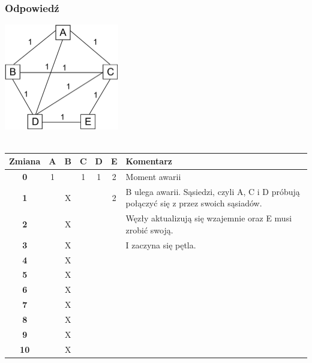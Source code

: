 		\subsubsection{Odpowiedź}
			\includegraphics[width=5.0cm]{./images/zadanie04.pdf}\\\\
			\begin{tabular}{|c|c|c|c|c|c|p{7cm}|}
				\hline \textbf{Zmiana} & \textbf{A} & \textbf{B} & \textbf{C} & \textbf{D} & \textbf{E} & \textbf{Komentarz} \\ 
				\hline \textbf{0} & 1 & \color{red}{X} & 1 & 1 & 2 & Moment awarii \\ 
				\hline \textbf{1} & \color{red}{2} & X & \color{red}{2} & \color{red}{2} & 2 & B ulega awarii. Sąsiedzi, czyli A, C i D próbują połączyć się z przez swoich sąsiadów. \\ 
				\hline \textbf{2} & \color{red}{3} & X & \color{red}{3} & \color{red}{3} & \color{red}{3} & Węzły aktualizują się wzajemnie oraz E musi zrobić swoją. \\ 
				\hline \textbf{3} & \color{red}{4} & X & \color{red}{4} & \color{red}{4} & \color{red}{4} & I zaczyna się pętla. \\
				\hline \textbf{4} & \color{red}{5} & X & \color{red}{5} & \color{red}{5} & \color{red}{5} &  \\ 
				\hline \textbf{5} & \color{red}{6} & X & \color{red}{6} & \color{red}{6} & \color{red}{6} &  \\ 
				\hline \textbf{6} & \color{red}{7} & X & \color{red}{7} & \color{red}{7} & \color{red}{7} &  \\ 
				\hline \textbf{7} & \color{red}{8} & X & \color{red}{8} & \color{red}{8} & \color{red}{8} &  \\ 
				\hline \textbf{8} & \color{red}{9} & X & \color{red}{9} & \color{red}{9} & \color{red}{9} &  \\ 
				\hline \textbf{9} & \color{red}{10} & X & \color{red}{10} & \color{red}{10} & \color{red}{10} &  \\ 
				\hline \textbf{10} & \color{red}{11} & X & \color{red}{11} & \color{red}{11} & \color{red}{11} &  \\ 

\end{tabular}
